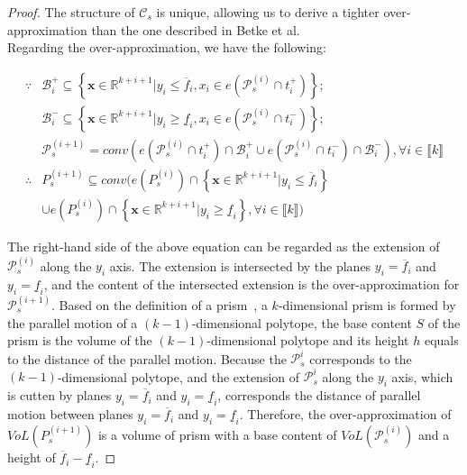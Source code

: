 \documentclass[runningheads]{llncs}
\newcommand{\myvec}[1]{\boldsymbol{#1}}
\begin{document}
\begin{proof} 
The structure of $\mathcal{C}_{s}$ is unique, allowing us to derive a tighter over-approximation than the one described in Betke et al.\\
Regarding the over-approximation, we have the following: 

\begin{equation*}
\begin{aligned}
\because &\mathcal{B}_{i}^{+} \subseteq \left\{\myvec{x}\in \mathbb{R}^{k+i+1}|y_{i}\leq \overline{f}_{i}, x_{i}\in e(\mathcal{P}^{(i)}_{s} \cap t_{i}^{+}) \right\};\\
& \mathcal{B}_{i}^{-} \subseteq \left\{\myvec{x}\in \mathbb{R}^{k+i+1}|y_{i}\geq \underline{f}_{i}, x_{i}\in e(\mathcal{P}^{(i)}_{s} \cap t_{i}^{-}) \right\};\\
& \mathcal{P}_{s}^{(i+1)} = conv( e(\mathcal{P}^{(i)}_{s} \cap t_{i}^{+} ) \cap \mathcal{B}_{i}^{+}
\cup e(\mathcal{P}^{(i)}_{s} \cap t_{i}^{-} ) \cap \mathcal{B}_{i}^{-}), \forall i \in \llbracket  k \rrbracket \\
\therefore  &P_{s}^{(i+1)} \subseteq conv( e(P^{(i)}_{s} ) \cap \left\{\myvec{x}\in \mathbb{R}^{k+i+1}|y_{i}\leq \overline{f}_{i} \right\}\\
 &\cup e(P^{(i)}_{s} ) \cap \left\{\myvec{x}\in \mathbb{R}^{k+i+1}|y_{i}\geq \underline{f}_{i} \right\}, \forall i \in \llbracket  k \rrbracket)
\end{aligned}
\end{equation*}

The right-hand side of the above equation can be regarded as the extension of $\mathcal{P}_{s}^{(i)}$ along the $y_{i}$ axis. The extension is intersected by the planes $y_{i} = \overline{f}_{i}$ and $y_{i}=\underline{f}_{i}$, and the content of the intersected extension is the over-approximation for $\mathcal{P}_{s}^{(i+1)}$. Based on the definition of a prism~\cite{sommerville2020introduction}, a $k$-dimensional prism is formed by the parallel motion of a $(k-1)$-dimensional polytope, the base content $S$ of the prism is the volume of the $(k-1)$-dimensional polytope and its height $h$ equals to the distance of the parallel motion.
Because the $\mathcal{P}_{s}^{i}$ corresponds to the $(k-1)$-dimensional polytope, and the extension of $\mathcal{P}_{s}^{i}$ along the $y_{i}$ axis, which is cutten by planes $y_{i} = \overline{f}_{i}$ and $y_{i} = \underline{f}_{i}$, corresponds the distance of parallel motion between planes $y_{i} = \overline{f}_{i}$ and $y_{i} = \underline{f}_{i}$. Therefore, the over-approximation of $VoL(P^{(i+1)}_{s})$ is a volume of prism with a base content of $VoL(\mathcal{P}_{s}^{(i)})$ and a height of $\overline{f}_{i} - \underline{f}_{i}$. 
 


\end{proof}
\end{document}
